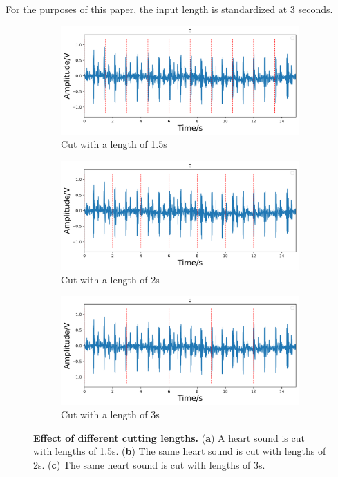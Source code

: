 For the purposes of this paper, the input length is standardized at 3 seconds.
\begin{figure}[!h]
\centering
    \begin{subfigure}{.9\linewidth}
        \centering
        \includegraphics[width=1\linewidth]{figs/disscussion/1.5s.png}
        \caption{Cut with a length of 1.5s}
        \label{FIG:length.a}
    \end{subfigure}\vfill
    \begin{subfigure}{.9\linewidth}
        \centering
        \includegraphics[width=1\linewidth]{figs/disscussion/2s.png}
        \caption{Cut with a length of 2s}
        \label{FIG:length.b}
    \end{subfigure}\vfill
    \begin{subfigure}{.9\linewidth}
        \centering
        \includegraphics[width=1\linewidth]{figs/disscussion/3s.png}
        \caption{Cut with a length of 3s}
        \label{FIG:length.c}
    \end{subfigure}
\caption{\textbf{Effect of different cutting lengths.} (\textbf{a}) A heart sound is cut with lengths of 1.5s. (\textbf{b}) The same heart sound is cut with lengths of 2s. (\textbf{c}) The same heart sound is cut with lengths of 3s.}
\label{FIG:length}
\end{figure}

